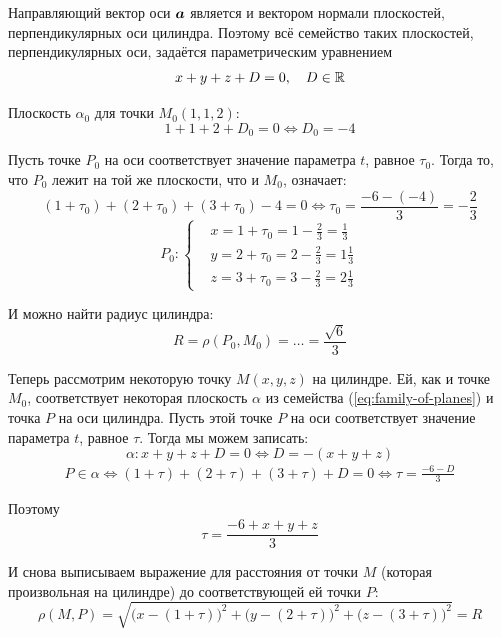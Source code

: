 \documentclass[a4paper,12pt]{article}
\begin{document}
\begin{solution}
    Направляющий вектор оси $\boldsymbol a$ является и вектором нормали плоскостей, перпендикулярных оси цилиндра.
    Поэтому всё семейство таких плоскостей, перпендикулярных оси, задаётся параметрическим уравнением
    \begin{equation}
      \label{eq:family-of-planes}
      x + y + z + D = 0,\quad D \in \operatorname{\mathbb R}
    \end{equation}
    
    Плоскость $\alpha_0$ для точки $M_0(1, 1, 2)$:
    \[
      1 + 1 + 2 + D_0 = 0 \Leftrightarrow D_0 = -4
    \]
    
    Пусть точке $P_0$ на оси соответствует значение параметра $t$, равное $\tau_0$.
    Тогда то, что $P_0$ лежит на той же плоскости, что и $M_0$, означает:
    \[
      (1 + \tau_0) + (2 + \tau_0) + (3 + \tau_0) - 4 = 0 \Leftrightarrow \tau_0 = \frac{-6 - (-4)}{3} = -\frac{2}{3}
    \]
    \[
      P_0\colon \left\{
        \begin{aligned}
          &x = 1 + \tau_0 = 1 - \frac{2}{3} = \frac{1}{3}\\
          &y = 2 + \tau_0 = 2 - \frac{2}{3} = 1\frac{1}{3}\\
          &z = 3 + \tau_0 = 3 - \frac{2}{3} = 2\frac{1}{3}
        \end{aligned}
      \right.
    \]
    
    И можно найти радиус цилиндра:
    \[
      R = \rho(P_0, M_0) = \ldots = \frac{\sqrt{6}}{3}
    \]
    
    Теперь рассмотрим некоторую точку $M(x, y, z)$ на цилиндре.
    Ей, как и точке $M_0$, соответствует некоторая плоскость $\alpha$ из семейства (\ref{eq:family-of-planes}) и точка $P$ на оси цилиндра.
    Пусть этой точке $P$ на оси соответствует значение параметра $t$, равное $\tau$.
    Тогда мы можем записать:
    \[
      \alpha\colon x + y + z + D = 0 \Leftrightarrow D = -(x + y + z)
    \]
    \begin{equation}
    \begin{split}
      P \in \alpha \Leftrightarrow (1 + \tau) + (2 + \tau) + (3 + \tau) + D = 0
      \Leftrightarrow \tau = \frac{-6 - D}{3}
    \end{split}
    \end{equation}
    
    Поэтому
    \begin{equation}
      \label{eq:t_P_prime}
      \tau = \frac{-6 + x + y + z}{3}
    \end{equation}
    
    И снова выписываем выражение для расстояния от точки $M$ (которая произвольная на цилиндре) до соответствующей ей точки $P$:
    \[
      \rho(M, P) = \sqrt{\bigl(x - (1 + \tau)\bigr)^2 + \bigl(y - (2 + \tau)\bigr)^2 + \bigl(z - (3 + \tau)\bigr)^2} = R
    \]
    

\end{solution}
\end{document}
